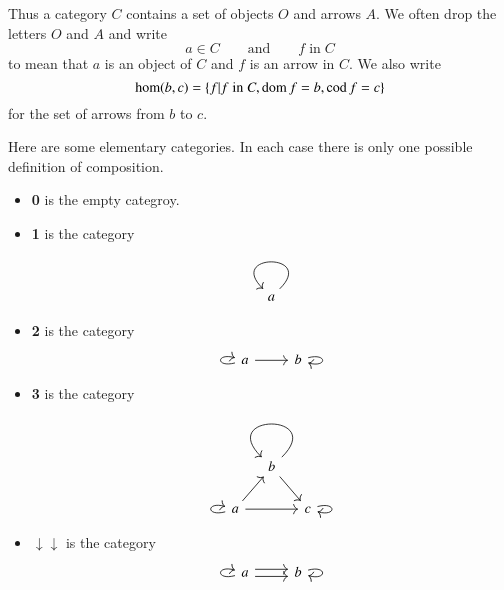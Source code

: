 Thus a category $C$ contains a set of objects $O$ and arrows $A$. We often drop the letters $O$ and $A$ and write
\[ a \in C \qquad \text{and}\qquad f\;\text{in}\; C \]
to mean that $a$ is an object of $C$ and $f$ is an arrow in $C$. We also write
\[ \hom(b,c) = \{f | f \;\text{in}\; C, \operatorname{dom} f = b , \operatorname{cod} f = c\} \]
for the set of arrows from $b$ to $c$.

\begin{example}
Here are some elementary categories. In each case there is only one possible definition of composition.
\begin{itemize}
\item \textbf{0} is the empty categroy.
\item \textbf{1} is the category
\[ \begin{tikzcd} a \arrow[loop] \end{tikzcd} \]
\item \textbf{2} is the category
\[ \begin{tikzcd}a \arrow[loop left] \rar{} & b\arrow[loop right] \end{tikzcd} \]
\item \textbf{3} is the category
\[ \begin{tikzcd}[column sep=small]
& b \arrow[dr]\arrow[loop] & \\
a \arrow[rr] \arrow[loop left] \arrow[ur] & & c \arrow[loop right]
\end{tikzcd} \]
\item $\downarrow\downarrow$ is the category
\[ \begin{tikzcd}a \arrow[loop left] \rar[shift left]\rar[shift right] & b \arrow[loop right]\end{tikzcd} \]
\end{itemize}
\end{example}
